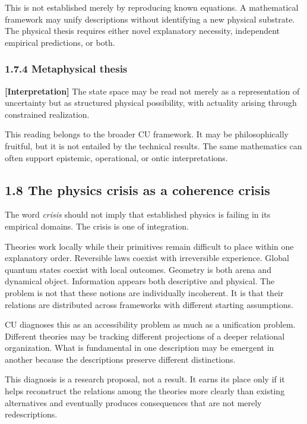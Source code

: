 \documentclass[
  11pt,
]{article}
\begin{document}
This is not established merely by reproducing known equations. A
mathematical framework may unify descriptions without identifying a new
physical substrate. The physical thesis requires either novel
explanatory necessity, independent empirical predictions, or both.

\subsubsection{1.7.4 Metaphysical thesis}\label{metaphysical-thesis}

\textbf{{[}Interpretation{]}} The state space may be read not merely as
a representation of uncertainty but as structured physical possibility,
with actuality arising through constrained realization.

This reading belongs to the broader CU framework. It may be
philosophically fruitful, but it is not entailed by the technical
results. The same mathematics can often support epistemic, operational,
or ontic interpretations.

\subsection{1.8 The physics crisis as a coherence
crisis}\label{the-physics-crisis-as-a-coherence-crisis}

The word \emph{crisis} should not imply that established physics is
failing in its empirical domains. The crisis is one of integration.

Theories work locally while their primitives remain difficult to place
within one explanatory order. Reversible laws coexist with irreversible
experience. Global quantum states coexist with local outcomes. Geometry
is both arena and dynamical object. Information appears both descriptive
and physical. The problem is not that these notions are individually
incoherent. It is that their relations are distributed across frameworks
with different starting assumptions.

CU diagnoses this as an accessibility problem as much as a unification
problem. Different theories may be tracking different projections of a
deeper relational organization. What is fundamental in one description
may be emergent in another because the descriptions preserve different
distinctions.

This diagnosis is a research proposal, not a result. It earns its place
only if it helps reconstruct the relations among the theories more
clearly than existing alternatives and eventually produces consequences
that are not merely redescriptions.
\end{document}
